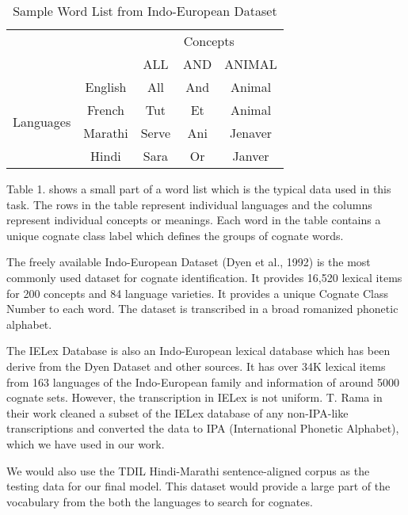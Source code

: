\documentclass[journal]{IEEEtran}
\begin{document}
\begin{table}[ht]
\centering
\caption{Sample Word List from Indo-European Dataset}
\begin{tabular}{cc|c|c|c|}
\cline{3-5}
                                                 &         & \multicolumn{3}{c|}{Concepts} \\ \cline{3-5} 
                                                 &         & ALL      & AND    & ANIMAL    \\ \hline
\multicolumn{1}{|c|}{\multirow{4}{*}{Languages}} & English & All      & And    & Animal    \\ \cline{2-5} 
\multicolumn{1}{|c|}{}                           & French  & Tut      & Et     & Animal    \\ \cline{2-5} 
\multicolumn{1}{|c|}{}                           & Marathi & Serve    & Ani    & Jenaver   \\ \cline{2-5} 
\multicolumn{1}{|c|}{}                           & Hindi   & Sara     & Or     & Janver    \\ \hline
\end{tabular}
\end{table}

Table 1. shows a small part of a word list which is the typical data used in this task. The rows in the table represent individual languages and the columns represent individual concepts or meanings. Each word in the table contains a unique cognate class label which defines the groups of cognate words.

The freely available Indo-European Dataset (Dyen et al., 1992) is the most commonly used dataset for cognate identification. It provides 16,520 lexical items for 200 concepts and 84 language varieties. It provides a unique Cognate Class Number to each word. The dataset is transcribed in a broad romanized phonetic alphabet.

The IELex Database is also an Indo-European lexical database which has been derive from the Dyen Dataset and other sources. It has over 34K lexical items from 163 languages of the Indo-European family and information of around 5000 cognate sets. However, the transcription in IELex is not uniform. T. Rama in their work \cite{rama2016siamese} cleaned a subset of the IELex database of any non-IPA-like transcriptions and converted the data to IPA (International Phonetic Alphabet), which we have used in our work.

We would also use the TDIL Hindi-Marathi sentence-aligned corpus as the testing data for our final model. This dataset would provide a large part of the vocabulary from the both the languages to search for cognates.
\end{document}
